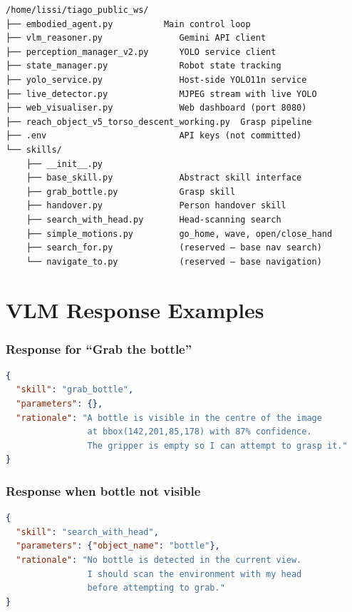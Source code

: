 \documentclass[12pt,a4paper]{report}
\begin{document}
\begin{verbatim}
/home/lissi/tiago_public_ws/
├── embodied_agent.py          Main control loop
├── vlm_reasoner.py               Gemini API client
├── perception_manager_v2.py      YOLO service client
├── state_manager.py              Robot state tracking
├── yolo_service.py               Host-side YOLO11n service
├── live_detector.py              MJPEG stream with live YOLO
├── web_visualiser.py             Web dashboard (port 8080)
├── reach_object_v5_torso_descent_working.py  Grasp pipeline
├── .env                          API keys (not committed)
└── skills/
    ├── __init__.py
    ├── base_skill.py             Abstract skill interface
    ├── grab_bottle.py            Grasp skill
    ├── handover.py               Person handover skill
    ├── search_with_head.py       Head-scanning search
    ├── simple_motions.py         go_home, wave, open/close_hand
    ├── search_for.py             (reserved — base nav search)
    └── navigate_to.py            (reserved — base navigation)
\end{verbatim}

\chapter{VLM Response Examples}
\label{app:responses}

\subsection*{Response for ``Grab the bottle''}

\begin{lstlisting}[language=JSON]
{
  "skill": "grab_bottle",
  "parameters": {},
  "rationale": "A bottle is visible in the centre of the image
                at bbox(142,201,85,178) with 87% confidence.
                The gripper is empty so I can attempt to grasp it."
}
\end{lstlisting}

\subsection*{Response when bottle not visible}

\begin{lstlisting}[language=JSON]
{
  "skill": "search_with_head",
  "parameters": {"object_name": "bottle"},
  "rationale": "No bottle is detected in the current view.
                I should scan the environment with my head
                before attempting to grab."
}
\end{lstlisting}
\end{document}
